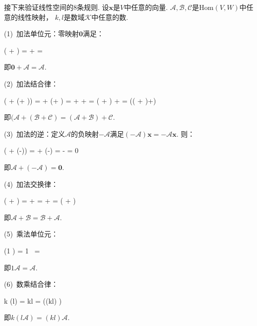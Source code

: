 \begin{pf}
    接下来验证线性空间的$8$条规则.
    设$\bm{x}$是$V$中任意的向量.
    $\mathcal{A},\mathcal{B},\mathcal{C}$是$\mathrm{Hom}(V,W)$中任意的线性映射，
    $k,l$是数域$\mathcal{K}$中任意的数.

    (1)~加法单位元：零映射$\bm{0}$满足：
    \begin{eq1}
        ( + )  
        =   +  
        = 
    \end{eq1}
    即$\bm{0} + \mathcal{A} = \mathcal{A}$.

    (2)~加法结合律：
    \begin{eq1}
        ( + (+ ))
        =   + (+ ) 
        =    +   +   
        = ( + ) +  
        = (( + )+) 
    \end{eq1}
    即$(\mathcal{A} + (\mathcal{B}+ \mathcal{C}) = (\mathcal{A} + \mathcal{B})+\mathcal{C}$.

    (3)~加法的逆：定义$\mathcal{A}$的负映射$-\mathcal{A}$满足$(-\mathcal{A})\bm{x} = - \mathcal{A} \bm{x}$.
    则：
    \begin{eq1}
        ( + (-))
        =   + (-)
        =   -  
        = 0
    \end{eq1}
    即$\mathcal{A} + (-\mathcal{A}) = \bm{0}$.

    (4)~加法交换律：
    \begin{eq1}
        ( + )  
        =   +  
        =   +  
        = ( + )  
    \end{eq1}
    即$\mathcal{A} + \mathcal{B} = \mathcal{B} + \mathcal{A}$.

    (5)~乘法单位元：
    \begin{eq1}
        (1 ) 
        = 1 \cdot {} \
        =  
    \end{eq1}
    即$1 \mathcal{A} = \mathcal{A}$.

    (6)~数乘结合律：
    \begin{eq1}
        k (l) 
        = kl   
        = ((kl) \mathcal{A}) \bm{x}
    \end{eq1}
    即$k (l \mathcal{A}) = (kl)\mathcal{A}$.


\end{pf}
